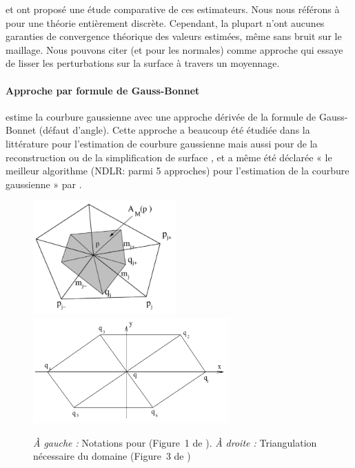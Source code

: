 %
 et  ont proposé
une étude comparative de ces estimateurs. Nous nous référons à
 pour une théorie entièrement discrète.
Cependant, la plupart n'ont aucunes garanties de convergence théorique des
valeurs estimées, même sans bruit sur le maillage. Nous pouvons citer
\cite{Rusinkiewicz2004} (et \cite{Page2002} pour les normales) comme approche
qui essaye de lisser les perturbations sur la surface à travers un moyennage.

\paragraph{Approche par formule de Gauss-Bonnet}
%
 estime la courbure gaussienne avec une approche dérivée de
la formule de Gauss-Bonnet (défaut d'angle). Cette approche a beaucoup été
étudiée dans la littérature pour l'estimation de courbure gaussienne
\cite{Meek2000, Stokely1992} mais aussi pour de la reconstruction \cite{Dyn2001}
ou de la simplification de surface \cite{Kim2002}, et a même été déclarée « le
meilleur algorithme (NDLR: parmi 5 approches) pour l'estimation de la courbure
gaussienne » par .

\begin{figure}[ht]
    \begin{center}
      \includegraphics[width=5.5cm]{images/Curvature/Notations_Xu}
      \includegraphics[width=7.5cm]{images/Curvature/Notations_Xu_2}
    \end{center}
    \caption[Notations pour .]{\emph{À gauche :} Notations pour  (Figure~1 de \cite{Xu2006}). \emph{À droite :} Triangulation nécessaire du domaine (Figure~3 de \cite{Xu2006})}
    \label{fig:xu_notations}
\end{figure}

